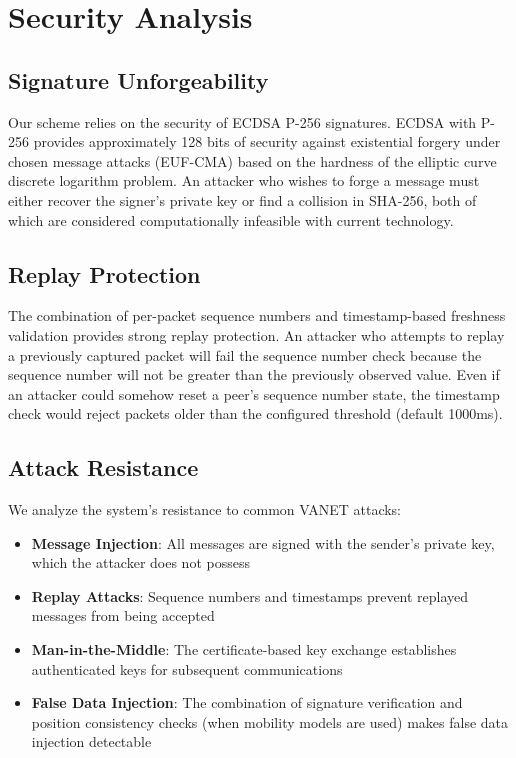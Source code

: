 \documentclass[conference]{IEEEtran}
\begin{document}
\section{Security Analysis}
\label{sec:security}

\subsection{Signature Unforgeability}

Our scheme relies on the security of ECDSA P-256 signatures. ECDSA with P-256 provides approximately 128 bits of security against existential forgery under chosen message attacks (EUF-CMA) based on the hardness of the elliptic curve discrete logarithm problem. An attacker who wishes to forge a message must either recover the signer's private key or find a collision in SHA-256, both of which are considered computationally infeasible with current technology.

\subsection{Replay Protection}

The combination of per-packet sequence numbers and timestamp-based freshness validation provides strong replay protection. An attacker who attempts to replay a previously captured packet will fail the sequence number check because the sequence number will not be greater than the previously observed value. Even if an attacker could somehow reset a peer's sequence number state, the timestamp check would reject packets older than the configured threshold (default 1000ms).

\subsection{Attack Resistance}

We analyze the system's resistance to common VANET attacks:

\begin{itemize}
    \item \textbf{Message Injection}: All messages are signed with the sender's private key, which the attacker does not possess
    \item \textbf{Replay Attacks}: Sequence numbers and timestamps prevent replayed messages from being accepted
    \item \textbf{Man-in-the-Middle}: The certificate-based key exchange establishes authenticated keys for subsequent communications
    \item \textbf{False Data Injection}: The combination of signature verification and position consistency checks (when mobility models are used) makes false data injection detectable
\end{itemize}
\end{document}
